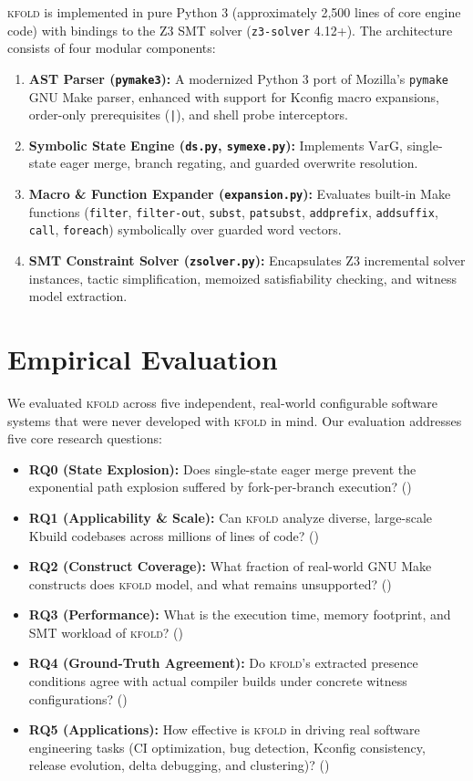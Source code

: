 \documentclass[acmsmall,screen,review]{acmart}
\newcommand{\tool}{\textsc{kfold}\xspace}
\begin{document}
\tool is implemented in pure Python 3 (approximately 2,500 lines of core engine code) with bindings to the Z3 SMT solver (\texttt{z3-solver} 4.12+). The architecture consists of four modular components:
\begin{enumerate}
\item \textbf{AST Parser (\texttt{pymake3}):} A modernized Python 3 port of Mozilla's \texttt{pymake} GNU Make parser, enhanced with support for Kconfig macro expansions, order-only prerequisites (\texttt{|}), and shell probe interceptors.
\item \textbf{Symbolic State Engine (\texttt{ds.py}, \texttt{symexe.py}):} Implements $\text{VarG}$, single-state eager merge, branch regating, and guarded overwrite resolution.
\item \textbf{Macro \& Function Expander (\texttt{expansion.py}):} Evaluates built-in Make functions (\texttt{filter}, \texttt{filter-out}, \texttt{subst}, \texttt{patsubst}, \texttt{addprefix}, \texttt{addsuffix}, \texttt{call}, \texttt{foreach}) symbolically over guarded word vectors.
\item \textbf{SMT Constraint Solver (\texttt{zsolver.py}):} Encapsulates Z3 incremental solver instances, tactic simplification, memoized satisfiability checking, and witness model extraction.
\end{enumerate}

\section{Empirical Evaluation}
\label{sec:eval}

We evaluated \tool across five independent, real-world configurable software systems that were never developed with \tool in mind. Our evaluation addresses five core research questions:

\begin{itemize}
\item \textbf{RQ0 (State Explosion):} Does single-state eager merge prevent the exponential path explosion suffered by fork-per-branch execution? ()
\item \textbf{RQ1 (Applicability \& Scale):} Can \tool analyze diverse, large-scale Kbuild codebases across millions of lines of code? ()
\item \textbf{RQ2 (Construct Coverage):} What fraction of real-world GNU Make constructs does \tool model, and what remains unsupported? ()
\item \textbf{RQ3 (Performance):} What is the execution time, memory footprint, and SMT workload of \tool? ()
\item \textbf{RQ4 (Ground-Truth Agreement):} Do \tool's extracted presence conditions agree with actual compiler builds under concrete witness configurations? ()
\item \textbf{RQ5 (Applications):} How effective is \tool in driving real software engineering tasks (CI optimization, bug detection, Kconfig consistency, release evolution, delta debugging, and clustering)? ()
\end{itemize}
\end{document}
